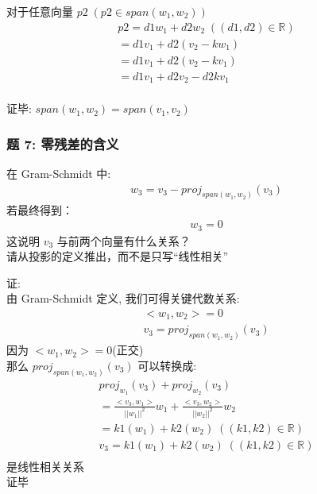 \documentclass[12pt]{article}
\begin{document}
\begin{flushleft}
    对于任意向量 $p2 \; (p2 \in span(w_{1},w_{2}))$ \\
    \begin{align}
        p2 = d1w_{1} + d2w_{2} \;({(d1,d2) \in \mathbb{R}}) \\
        = d1v_{1} + d2(v_{2}- kw_{1})                       \\
        = d1v_{1} + d2(v_{2} -kv_{1})                       \\
        = d1v_{1} + d2v_{2} -d2kv_{1}                       \\
    \end{align}

    证毕: $ span(w_{1}, w_{2}) =  span(v_{1},v_{2})$
\end{flushleft}


\begin{flushleft}
    \subsubsection{题 7: 零残差的含义}
    在 Gram-Schmidt 中:
    \begin{align}
        w_{3} = v_{3} - proj_{span(w_{1},w_{2})}(v_{3})
    \end{align}
    若最终得到：
    \begin{align}
        w_{3} = 0
    \end{align}
    这说明 $v_{3}$ 与前两个向量有什么关系？\\
    请从投影的定义推出，而不是只写“线性相关”

    证: \\
    由 Gram-Schmidt 定义, 我们可得关键代数关系: \\
    \begin{align}
        <w_{1},w_{2}> = 0 \\
        v_{3} = proj_{span(w_{1},w_{2})}(v_{3})
    \end{align}
    因为 $<w_{1},w_{2}> = 0$(正交) \\
    那么 $proj_{span(w_{1},w_{2})}(v_{3})$ 可以转换成: \\
    \begin{align}
        proj_{w_{1}}(v_{3}) + proj_{w_{2}}(v_{3})                                             \\
        = \frac{<v_{3},w_{1}>}{||w_{1}||^{2}}w_{1} + \frac{<v_{3},w_{2}>}{||w_{2}||^{2}}w_{2} \\
        = k1(w_{1}) + k2(w_{2}) \;({(k1,k2) \in \mathbb{R}})                                  \\
        v_{3} = k1(w_{1}) + k2(w_{2}) \;({(k1,k2) \in \mathbb{R}})                            \\
    \end{align}
    是线性相关关系\\
    证毕


\end{flushleft}
\end{document}
